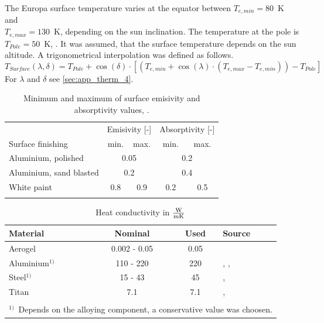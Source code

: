 The Europa surface temperature varies at the  equator between $T_{e,min}=80$\ K and\\ $T_{e,max}=130$\ K, depending on the sun inclination.
The temperature at the pole is $T_{Pole}=50$\ K, \cite{Europa}.
It was assumed, that the surface temperature depends on the sun altitude.
A trigonometrical interpolation was defined as follows.
\[ T_{Surface}(\lambda, \delta) = T_{Pole} + \cos (\delta) \cdot [(T_{e,min}+\cos (\lambda)\cdot (T_{e,max}-T_{e,min}))-T_{Pole}] \]
For $\lambda$ and $\delta$ see \autoref{sec:app_therm_4}.\\

\begin{table}[H]
	\centering
	\caption{Minimum and maximum of surface emisivity and absorptivity values, \cite{ref_tcs_05}.}
	\begin{tabular}{l@{\qquad}cc@{\qquad}cc}
		\hline
		& \multicolumn{2}{l}{Emisivity [-]} & \multicolumn{2}{l}{Absorptivity [-]}  \\ 
		Surface finishing	&	min. & max. 	&	min. & max.   \\\hline
		Aluminium, polished & \multicolumn{2}{c}{0.05} & \multicolumn{2}{c}{0.2}   \\
		Aluminium, sand blasted & \multicolumn{2}{c}{0.2} & \multicolumn{2}{c}{0.4}   \\
		White paint & 0.8 & 0.9 & 0.2 & 0.5  \\ \hline
		& & & & \\
	\end{tabular}
	\label{tab:tcs_surface}
\end{table}


\begin{table}[H]
	\centering
	\caption{Heat conductivity in $\frac{{\rm W}}{{\rm m} {\rm K}}$}
	\begin{tabular}{l@{\qquad\qquad}c@{\qquad\qquad}c@{\qquad\qquad}l}
		\hline
		Material & Nominal & Used & Source \\ \hline
		Aerogel & 0.002 - 0.05 & 0.05 & \cite{ref_tcs_03} \\
		Aluminium$^{1)}$  & 110 - 220 & 220 & \cite{ref_tcs_10}, \cite{ref_tcs_11}, \cite{ref_tcs_12} \\
		Steel$^{1)}$ & 15 - 43 & 45 & \cite{ref_tcs_08}, \cite{ref_tcs_09} \\ 
		Titan  & 7.1  & 7.1 & \cite{ref_tcs_06}, \cite{ref_tcs_07} \\\hline
		&&&\\[-0.75em]
		\multicolumn{4}{l}{\small{$^{1)}$\  Depends on the alloying component, a conservative value was choosen.}}\\
	\end{tabular}
	\label{tab:tcs_conduct2}
\end{table}

